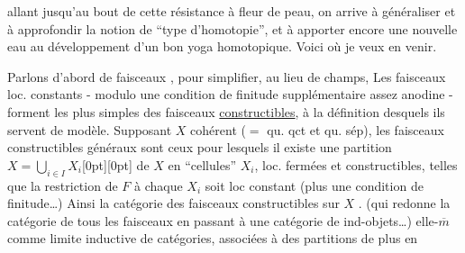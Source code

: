 %
allant jusqu'au bout\unsure{,} de cette résistance à fleur de peau, on arrive à généraliser et à approfondir la notion de ``type d'homotopie'', et à apporter encore une nouvelle eau au développement d'un bon yoga homotopique. Voici où je veux en venir.

Parlons d'abord de faisceaux , pour simplifier, au lieu de champs,  Les faisceaux loc. constants - modulo une condition de finitude supplémentaire assez anodine - forment les plus simples des faisceaux \uline{constructibles}, à la définition desquels ils servent de modèle. Supposant $X$ cohérent ($=$ qu. qct et qu. sép), les faisceaux constructibles généraux sont ceux pour lesquels il existe une partition  $X=\bigcup\limits_{i\in I}X_i$\raisebox{-1.7ex}[0pt][0pt]{} de $X$ en ``cellules''  $X_i$, loc. fermées et constructibles, telles que  la restriction de $F$ à chaque $X_i$ soit loc constant  (plus une condition de finitude\ldots) Ainsi la catégorie des faisceaux constructibles sur $X$ . (qui redonne la catégorie de tous les faisceaux en passant à une catégorie de ind-objets\ldots)  elle-$\overline m$ comme limite inductive de catégories, associées à des partitions de plus en
